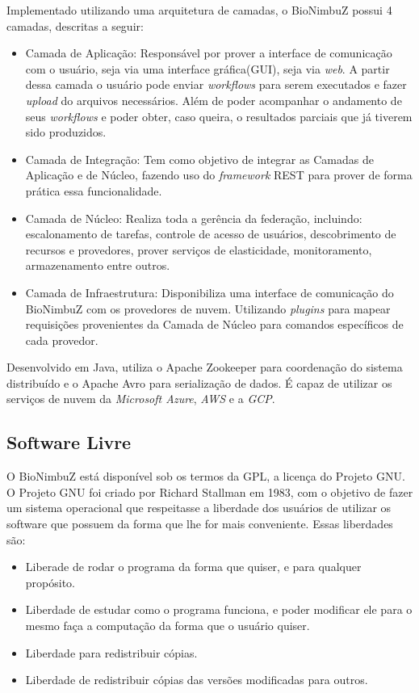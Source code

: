 Implementado utilizando uma arquitetura de camadas, o BioNimbuZ possui 4 camadas, descritas a seguir:
\begin{itemize}
	\item Camada de Aplicação: Responsável por prover a interface de comunicação com o usuário, seja via uma interface gráfica(GUI), seja via \textit{web}. A partir dessa camada o usuário pode enviar \textit{workflows} para serem executados e fazer \textit{upload} do arquivos necessários. Além de poder acompanhar o andamento de seus \textit{workflows} e poder obter, caso queira, o resultados parciais que já tiverem sido produzidos. 
	
	\item Camada de Integração: Tem como objetivo de integrar as Camadas de Aplicação e de Núcleo, fazendo uso do \textit{framework} REST para prover de forma prática essa funcionalidade.
	
	\item Camada de Núcleo: Realiza toda a gerência da federação, incluindo: escalonamento de tarefas, controle de acesso de usuários, descobrimento de recursos e provedores, prover serviços de elasticidade, monitoramento, armazenamento entre outros.
	
	\item Camada de Infraestrutura: Disponibiliza uma interface de comunicação do BioNimbuZ com os provedores de nuvem. Utilizando \textit{plugins} para mapear requisições provenientes da Camada de Núcleo para comandos específicos de cada provedor.
\end{itemize}

Desenvolvido em Java, utiliza o Apache Zookeeper\cite{Zookeeper} para coordenação do sistema distribuído e o Apache Avro\cite{Avro} para serialização de dados. É capaz de utilizar os serviços de nuvem da \textit{Microsoft Azure}, \textit{\acrshort{AWS}} e a \textit{\acrshort{GCP}}.


\subsection{Software Livre}
O BioNimbuZ está disponível sob os termos da \acrfull{GPL}, a licença do Projeto \acrfull{GNU}. O Projeto GNU foi criado por Richard Stallman em 1983, com o objetivo de fazer um sistema operacional que respeitasse a liberdade dos usuários de utilizar os software que possuem da forma que lhe for mais conveniente. Essas liberdades são\cite{Free_Software}:

\begin{itemize}
	\item Liberade de rodar o programa da forma que quiser, e para qualquer propósito.
	\item Liberdade de estudar como o programa funciona, e poder modificar ele para o mesmo faça a computação da forma que o usuário quiser.
	\item Liberdade para redistribuir cópias.
	\item Liberdade de redistribuir cópias das versões modificadas para outros.
\end{itemize}

